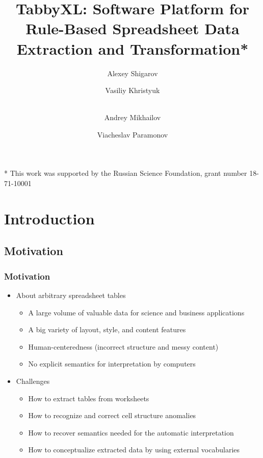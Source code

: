 \documentclass{beamer}
\title[Tabby{XL}]{Tabby{XL}: Software Platform for Rule-Based Spreadsheet Data Extraction and Transformation*} %
\author[Shigarov et al.]{Alexey Shigarov \and Vasiliy Khristyuk \and \\ Andrey Mikhailov \and Viacheslav Paramonov} %
\institute[ISDCT SB RAS] %
{
Matrosov Institute for System Dynamics and Control Theory,\\ Siberian Branch of the Russian Academy of Sciences \\ %
\medskip
\textit{shigarov@icc.ru} %
}
\begin{document}
\begin{frame}
\titlepage %
\tiny\centerline{* This work was supported by the Russian Science Foundation, grant number 18-71-10001}
\end{frame}


\section{Introduction} %

\subsection{Motivation}

\begin{frame}
\frametitle{Motivation}
\begin{itemize}
\item About arbitrary spreadsheet tables
\begin{itemize}
	\item A large volume of valuable data for science and business applications
	\item A big variety of layout, style, and content features
	\item Human-centeredness (incorrect structure and messy content)
	\item No explicit semantics for interpretation by computers
\end{itemize}
\bigskip
\item Challenges
\begin{itemize}
	\item How to extract tables from worksheets
	\item How to recognize and correct cell structure anomalies
	\item How to recover semantics needed for the automatic interpretation
	\item How to conceptualize extracted data by using external vocabularies
\end{itemize}
\end{itemize}
\end{frame}
\end{document}
